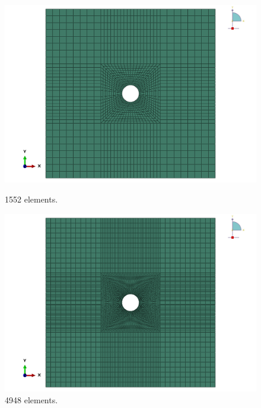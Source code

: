\documentclass[12pt]{article}
\begin{document}
\begin{figure}[H]
    \centering
    \begin{minipage}{0.24\textwidth}
        \centering
        \includegraphics[width=\textwidth]{images/Mesh5.png}
        \caption*{1552 elements.}
    \end{minipage}
    \begin{minipage}{0.24\textwidth}
        \centering
        \includegraphics[width=\textwidth]{images/Mesh6.png}
        \caption*{4948 elements.}
    \end{minipage}
    \begin{minipage}{0.24\textwidth}
        \centering

\end{minipage}
\end{figure}
\end{document}
